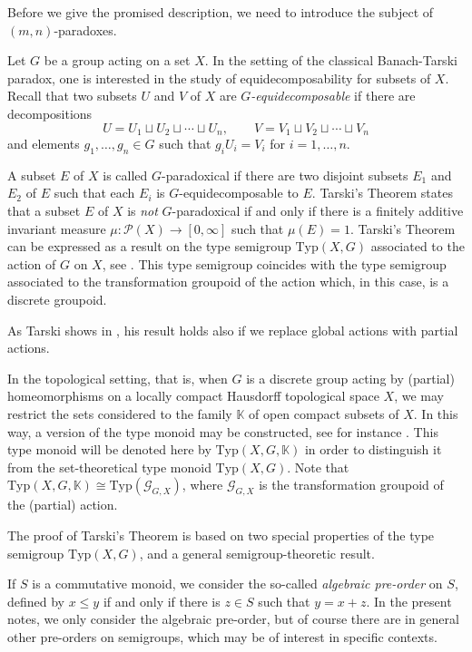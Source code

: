 \documentclass[11pt]{amsart}
\theoremstyle{plain}            %
\theoremstyle{definition}       %
\theoremstyle{definition}       %
\theoremstyle{remark}
\newcommand{\Typ}{\mathrm{Typ}}
\begin{document}
Before we give the promised description, we need to introduce the subject of $(m,n)$-paradoxes. 

Let $G$ be a group acting on a set $X$. In the setting of the classical Banach-Tarski paradox, one is interested in the study of equidecomposability for subsets of $X$. Recall that two subsets $U$ and $V$ of $X$ are {\it $G$-equidecomposable} if there are decompositions
$$U=U_1\sqcup U_2\sqcup \cdots \sqcup U_n, \qquad V=V_1\sqcup V_2\sqcup \cdots \sqcup V_n$$
and elements $g_1,\dots , g_n\in G$ such that $g_iU_i=V_i$ for $i=1,\dots , n$. 

A subset $E$ of $X$ is called $G$-paradoxical if there are two disjoint subsets $E_1$ and $E_2$ of $E$ such that each $E_i$ is $G$-equidecomposable to $E$. Tarski's Theorem states that a subset $E$ of $X$ is {\it not} $G$-paradoxical if and only if there is a finitely additive invariant measure $\mu\colon \mathcal P (X)\to [0,\infty]$ such that $\mu (E)=1$.  Tarski's Theorem can be
expressed as a result on the type semigroup $\Typ (X,G)$ associated to the action of $G$ on $X$, see
\cite[Theorem 11.1 and Corollary 11.2]{TomWagon}. This type semigroup coincides with the type semigroup associated to the transformation groupoid of the action which, in this case, is a discrete groupoid. 


As Tarski shows in
\cite[Theorem 16.12]{Tarski}, his result holds also if we replace
global actions with partial actions. 

In the topological setting, that is, when $G$ is a discrete group acting by (partial) homeomorphisms on a locally compact Hausdorff topological space $X$, we may restrict the sets considered to the family $\mathbb K$ of open compact subsets of $X$. In this way, a version of the type monoid may be constructed, see for instance \cite[Section 7]{ae14}. This type monoid will be denoted here by
$\Typ (X,G,\mathbb K)$ in order to distinguish it from the set-theoretical type monoid $\Typ (X,G)$. Note that $\Typ (X,G,\mathbb K)\cong \Typ (\mathcal G _{G,X})$, where $\mathcal G_{G,X}$ is the transformation groupoid of the (partial) action.  



The proof of Tarski's Theorem is based on
two special properties of the type semigroup $\Typ (X,G)$, and a general semigroup-theoretic result.

If $S$ is a commutative monoid, we consider the so-called {\it algebraic pre-order} on $S$, defined by $x\le y$ if and only if there is $z\in S$ such that $y=x+z$. In the present notes, we only consider the algebraic pre-order, but of course there are in general other pre-orders on semigroups, which may be of interest in specific contexts.  
\end{document}
